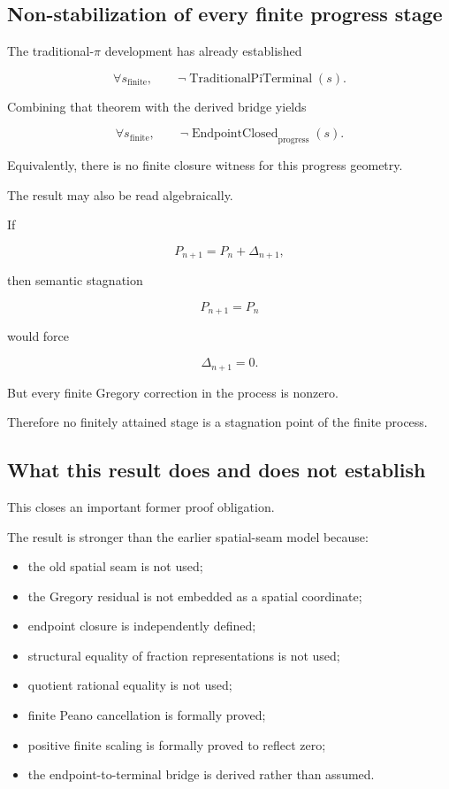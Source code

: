 \documentclass[11pt,a4paper]{article}
\begin{document}
\subsection{Non-stabilization of every finite progress stage}

The traditional-\(\pi\) development has already established

\[
\forall s_{\mathrm{finite}},
\qquad
\neg
\operatorname{TraditionalPiTerminal}(s).
\]

Combining that theorem with the derived bridge yields

\[
\boxed{
\forall s_{\mathrm{finite}},
\qquad
\neg
\operatorname{EndpointClosed}_{\mathrm{progress}}(s).
}
\]

Equivalently, there is no finite closure witness for this progress
geometry.

The result may also be read algebraically.

If

\[
P_{n+1}=P_n+\Delta_{n+1},
\]

then semantic stagnation

\[
P_{n+1}=P_n
\]

would force

\[
\Delta_{n+1}=0.
\]

But every finite Gregory correction in the process is nonzero.

Therefore no finitely attained stage is a stagnation point of the
finite process.

\subsection{What this result does and does not establish}

This closes an important former proof obligation.

The result is stronger than the earlier spatial-seam model because:

\begin{itemize}
\item the old spatial seam is not used;
\item the Gregory residual is not embedded as a spatial coordinate;
\item endpoint closure is independently defined;
\item structural equality of fraction representations is not used;
\item quotient rational equality is not used;
\item finite Peano cancellation is formally proved;
\item positive finite scaling is formally proved to reflect zero;
\item the endpoint-to-terminal bridge is derived rather than assumed.
\end{itemize}
\end{document}
